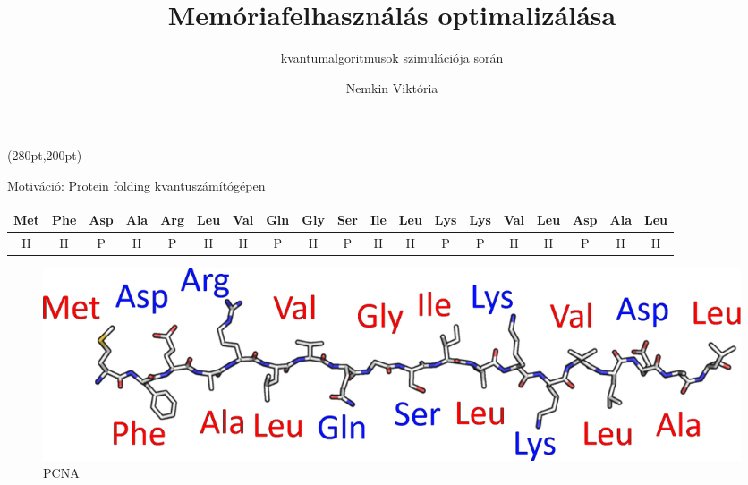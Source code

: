 \documentclass[aspectratio=169]{beamer}
\author[Nemkin Viktória]{Nemkin Viktória}
\institute[]{
\begin{small}dr. Friedl Katalin\end{small}\\
\begin{footnotesize}Számítástudományi és Információelméleti Tanszék\end{footnotesize}
}
\title{Memóriafelhasználás optimalizálása}
\subtitle{kvantumalgoritmusok szimulációja során}
\date{}
\begin{document}
\begin{frame}
\titlepage

\begin{textblock*}{150pt}(280pt,200pt) %

\end{textblock*}
\end{frame}


\begin{frame}{Motiváció: Protein folding kvantuszámítógépen}

\begin{tiny}
\begin{tabular}{c|c|c|c|c|c|c|c|c|c|c|c|c|c|c|c|c|c|c}

Met & Phe & Asp & Ala & Arg & Leu & Val & Gln & Gly & Ser & Ile & Leu & Lys & Lys & Val & Leu & Asp & Ala & Leu \\

\hline
H & H & P & H & P & H & H & P & H & P & H & H & P & P & H & H & P & H & H
\end{tabular}
\end{tiny}

\begin{figure}[H]
    \centering
    \includegraphics[width=0.5\linewidth]{./figures/protein_structure_primary.png}
    \caption{PCNA}
  \end{figure}
\end{frame}
\end{document}
